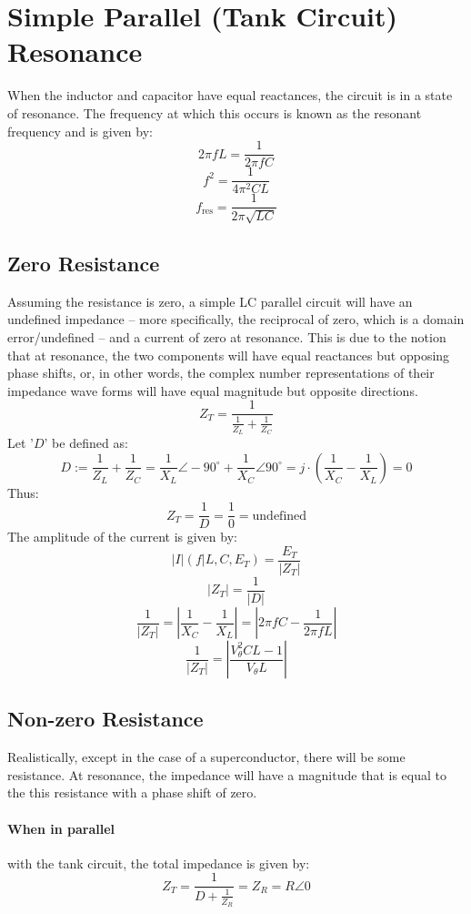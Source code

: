 \documentclass{article}
\begin{document}
	\section[Parallel]{Simple Parallel (Tank Circuit) Resonance }
	When the inductor and capacitor have equal reactances, the circuit is in a 
	state of resonance.  The frequency at which this occurs is known as the 
	resonant frequency and is given by:
	$$ 2 \pi f L = \frac{1}{2 \pi f C}$$ 
	$$ f^2 = \frac{1}{4\pi ^2 C L}$$
	\begin{equation}\label{eq:res-freq}
	f_{\text{res}}=\frac{1}{2\pi \sqrt{LC}}
	\end{equation}
	\subsection[ZeroR]{Zero Resistance}
	Assuming the resistance is zero, a simple LC parallel circuit will have an 
	undefined impedance -- more specifically, the reciprocal of zero, which is 
	a domain error/undefined -- and a current of zero at resonance.  This is 
	due to the notion that at resonance, the two components will have equal 
	reactances but opposing phase shifts, or, in other words, the complex 
	number representations of their impedance wave forms will have equal 
	magnitude but opposite directions.
	$$ Z_T = \frac{1}{\frac{1}{Z_L} + \frac{1}{Z_C}}$$
	Let '$D$' be defined as:
	$$ D := \frac{1}{Z_L} + \frac{1}{Z_C} = \frac{1}{X_L}\angle-90^{\circ} + 
	\frac{1}{X_C}\angle90^{\circ} = j \cdot \left(\frac{1}{X_C} - \frac{1}{X_L} 
	\right) = 
	0$$
	Thus:
	$$ Z_T = \frac{1}{D} = \frac{1}{0} = \text{undefined}$$
	The amplitude of the current is given by:
	$$ |I|(f \vert L, C, E_T) = \frac{E_T}{|Z_T|}$$
	$$ |Z_T| = \frac{1}{|D|} $$
	$$ \frac{1}{|Z_T|} = \left| \frac{1}{X_C} - \frac{1}{X_L}\right | = \left| 
	2\pi f C - 
	\frac{1}{2 \pi f L} \right |$$
	$$ \frac{1}{|Z_T|} = \left | \frac{V_\theta^2 CL - 1}{V_\theta L} \right|$$
	\subsection[NonZeroR]{Non-zero Resistance}
	Realistically, except in the case of a superconductor, there will be some 
	resistance.  At resonance, the impedance will have a magnitude that is 
	equal to the this resistance with a phase shift of zero.
	\paragraph[In Parallel]{When in parallel} with the tank circuit, the total 
	impedance is given by:
	$$ Z_T = \frac{1}{D + \frac{1}{Z_R}} = Z_R = R\angle0$$
\end{document}
